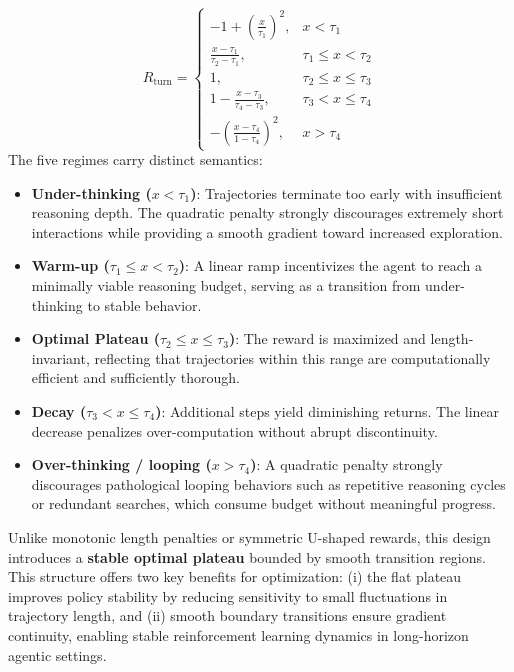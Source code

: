 \documentclass{huawei}
\begin{document}
\begin{equation}
R_{\text{turn}} =
\begin{cases}
-1 + \left(\frac{x}{\tau_1}\right)^2, & x < \tau_1 \\
\frac{x - \tau_1}{\tau_2 - \tau_1}, & \tau_1 \le x < \tau_2 \\
1, & \tau_2 \le x \le \tau_3 \\
1 - \frac{x - \tau_3}{\tau_4 - \tau_3}, & \tau_3 < x \le \tau_4 \\
- \left(\frac{x - \tau_4}{1 - \tau_4}\right)^2, & x > \tau_4
\end{cases}
\end{equation}
The five regimes carry distinct semantics:
\begin{itemize}[leftmargin=1em, listparindent=\parindent]
\item \textbf{Under-thinking ($x < \tau_1$)}: Trajectories terminate too early with insufficient reasoning depth. The quadratic penalty strongly discourages extremely short interactions while providing a smooth gradient toward increased exploration.

\item \textbf{Warm-up ($\tau_1 \le x < \tau_2$)}: A linear ramp incentivizes the agent to reach a minimally viable reasoning budget, serving as a transition from under-thinking to stable behavior.

\item \textbf{Optimal Plateau ($\tau_2 \le x \le \tau_3$)}: The reward is maximized and length-invariant, reflecting that trajectories within this range are computationally efficient and sufficiently thorough.

\item \textbf{Decay ($\tau_3 < x \le \tau_4$)}: Additional steps yield diminishing returns. The linear decrease penalizes over-computation without abrupt discontinuity.

\item \textbf{Over-thinking / looping ($x > \tau_4$)}: A quadratic penalty strongly discourages pathological looping behaviors such as repetitive reasoning cycles or redundant searches, which consume budget without meaningful progress.
\end{itemize}

Unlike monotonic length penalties or symmetric U-shaped rewards, this design introduces a \textbf{stable optimal plateau} bounded by smooth transition regions. This structure offers two key benefits for optimization: (i) the flat plateau improves policy stability by reducing sensitivity to small fluctuations in trajectory length, and (ii) smooth boundary transitions ensure gradient continuity, enabling stable reinforcement learning dynamics in long-horizon agentic settings.
\end{document}

